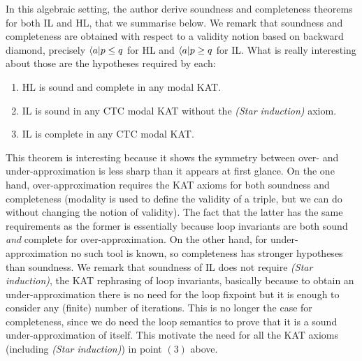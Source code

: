 In this algebraic setting, the author derive soundness and completeness theorems for both IL and HL, that we summarise below. We remark that soundness and completeness are obtained with respect to a validity notion based on backward diamond, precisely $\langle a \vert p \le q$ for HL and $\langle a \vert p \ge q$ for IL.
What is really interesting about those are the hypotheses required by each:
\begin{theorem}
	\leavevmode
	\begin{enumerate}
		\item HL is sound and complete in any modal KAT.
		\item IL is sound in any CTC modal KAT without the \textit{(Star induction)} axiom.
		\item IL is complete in any CTC modal KAT.
	\end{enumerate}
\end{theorem}
This theorem is interesting because it shows the symmetry between over- and under-approximation is less sharp than it appears at first glance.
On the one hand, over-approximation requires the KAT axioms for both soundness and completeness (modality is used to define the validity of a triple, but we can do without changing the notion of validity). The fact that the latter has the same requirements as the former is essentially because loop invariants are both sound \emph{and} complete for over-approximation.
On the other hand, for under-approximation no such tool is known, so completeness has stronger hypotheses than soundness. We remark that soundness of IL does not require \textit{(Star induction)}, the KAT rephrasing of loop invariants, basically because to obtain an under-approximation there is no need for the loop fixpoint but it is enough to consider any (finite) number of iterations. This is no longer the case for completeness, since we do need the loop semantics to prove that it is a sound under-approximation of itself. This motivate the need for all the KAT axioms (including \textit{(Star induction)}) in point $(3)$ above.

